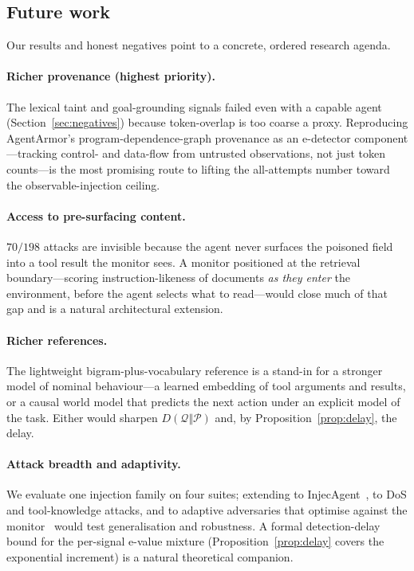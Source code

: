 \documentclass[10pt,journal,compsoc]{IEEEtran}
\theoremstyle{plain}
\theoremstyle{definition}
\newcommand{\Pcal}{\mathcal{P}}
\newcommand{\Qcal}{\mathcal{Q}}
\begin{document}
\subsection{Future work}\label{sec:future}

Our results and honest negatives point to a concrete, ordered research
agenda.

\paragraph{Richer provenance (highest priority).} The lexical taint and
goal-grounding signals failed even with a capable agent
(Section~\ref{sec:negatives}) because token-overlap is too coarse a proxy.
Reproducing AgentArmor's program-dependence-graph provenance as an e-detector
component---tracking control- and data-flow from untrusted observations, not
just token counts---is the most promising route to lifting the all-attempts
number toward the observable-injection ceiling.

\paragraph{Access to pre-surfacing content.} \(70/198\) attacks are invisible
because the agent never surfaces the poisoned field into a tool result the
monitor sees. A monitor positioned at the retrieval boundary---scoring
instruction-likeness of documents \emph{as they enter} the environment, before
the agent selects what to read---would close much of that gap and is a natural
architectural extension.

\paragraph{Richer references.} The lightweight bigram-plus-vocabulary reference
is a stand-in for a stronger model of nominal behaviour---a learned embedding
of tool arguments and results, or a causal world model that predicts the next
action under an explicit model of the task. Either would sharpen
\(D(\Qcal\Vert\Pcal)\) and, by Proposition~\ref{prop:delay}, the delay.

\paragraph{Attack breadth and adaptivity.} We evaluate one injection family on
four suites; extending to InjecAgent~\cite{zhan2024injecagent}, to DoS and
tool-knowledge attacks, and to adaptive adversaries that optimise against the
monitor~\cite{nasr2025attackersecond} would test generalisation and
robustness. A formal detection-delay bound for the per-signal e-value mixture
(Proposition~\ref{prop:delay} covers the exponential increment) is a natural
theoretical companion.
\end{document}
